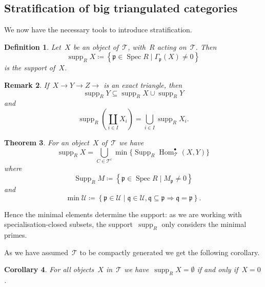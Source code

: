\documentclass[10pt,a4paper]{article}
\theoremstyle{lecture}
\newtheorem{theorem}{Theorem}
\newtheorem{corollary}[theorem]{Corollary}
\newtheorem{definition}[theorem]{Definition}
\newtheorem{remark}[theorem]{Remark}
\newcommand\cc{\ensuremath{\mathrm{c}}}
\DeclareMathOperator\Hom{Hom}
\DeclareMathOperator\Spec{Spec}
\DeclareMathOperator\Supp{Supp}
\DeclareMathOperator\supp{supp}
\begin{document}
\subsection{Stratification of big triangulated categories}
We now have the necessary tools to introduce stratification.
\begin{definition}
  Let~$X$ be an object of~$\mathcal{T}$, with~$R$ acting on~$\mathcal{T}$. Then
  \begin{equation}
    \supp_R X\coloneqq\left\{ \mathfrak{p}\in\Spec R\mid\Gamma_{\mathfrak{p}}(X)\neq 0 \right\}
  \end{equation}
  is the \emph{support} of~$X$.
\end{definition}
\begin{remark}
  If~$X\to Y\to Z\to$ is an exact triangle, then
  \begin{equation}
    \supp_R Y\subseteq\supp_R X\cup\supp_R Y
  \end{equation}
  and
  \begin{equation}
    \supp_R\left( \coprod_{i\in I}X_i \right)=\bigcup_{i\in I}\supp_R X_i.
  \end{equation}
\end{remark}

\begin{theorem}
  For an object~$X$ of~$\mathcal{T}$ we have
  \begin{equation}
    \supp_R X=\bigcup_{C\in\mathcal{T}^\cc}\min\{\Supp_R\Hom_{\mathcal{T}}^\bullet(X,Y)\}
  \end{equation}
  where
  \begin{equation}
    \Supp_R M\coloneqq\left\{ \mathfrak{p}\in\Spec R\mid M_{\mathfrak{p}}\neq 0 \right\}
  \end{equation}
  and
  \begin{equation}
    \min\mathcal{U}\coloneqq\left\{ \mathfrak{p}\in\mathcal{U}\mid\mathfrak{q}\in\mathcal{U},\mathfrak{q}\subseteq\mathfrak{p}\Rightarrow\mathfrak{q}=\mathfrak{p} \right\}.
  \end{equation}
\end{theorem}
Hence the minimal elements determine the support: as we are working with specialisation-closed subsets, the support~$\supp_R$ only considers the minimal primes.

As we have assumed~$\mathcal{T}$ to be compactly generated we get the following corollary.
\begin{corollary}
  For all objects~$X$ in~$\mathcal{T}$ we have~$\supp_R X=\emptyset$ if and only if~$X=0$.
\end{corollary}
\end{document}
